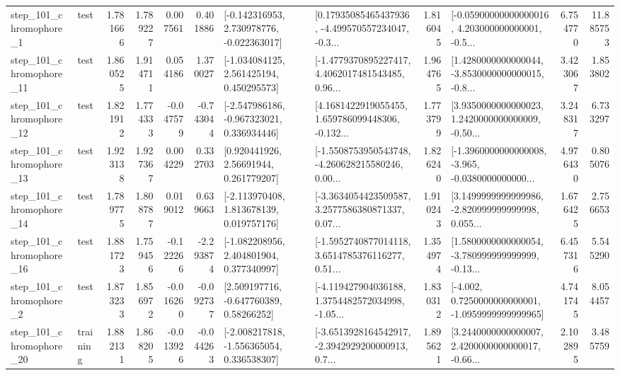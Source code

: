\begin{tabular}{llrrrrllrlrr}
   step\_101\_chromophore\_1 &      test &      1.781666 &    1.789227 &      0.007561 &  0.401886 &   [-0.142316953, 2.730978776, -0.022363017] &  [0.17935085465437936, -4.499570557234047, -0.3... &       1.816045 &  [-0.05900000000000016, 4.203000000000001, -0.5... &            6.754770 &         11.885753 \\
  step\_101\_chromophore\_11 &      test &      1.860525 &    1.914711 &      0.054186 &  1.370027 &    [-1.034084125, 2.561425194, 0.450295573] &  [-1.4779370895227417, 4.4062017481543485, 0.96... &       1.964765 &  [1.4280000000000044, -3.8530000000000015, -0.8... &            3.423067 &          1.853802 \\
  step\_101\_chromophore\_12 &      test &      1.821912 &    1.774333 &     -0.047579 & -0.743044 &   [-2.547986186, -0.967323021, 0.336934446] &  [4.1681422919055455, 1.659786099448306, -0.132... &       1.773799 &  [3.9350000000000023, 1.2420000000000009, -0.50... &            3.248317 &          6.733297 \\
  step\_101\_chromophore\_13 &      test &      1.923138 &    1.927367 &      0.004229 &  0.332703 &      [0.920441926, 2.56691944, 0.261779207] &  [-1.5508753950543748, -4.260628215580246, 0.00... &       1.826240 &  [-1.3960000000000008, -3.965, -0.0380000000000... &            4.976430 &          0.805076 \\
  step\_101\_chromophore\_14 &      test &      1.789775 &    1.808787 &      0.019012 &  0.639663 &    [-2.113970408, 1.813678139, 0.019757176] &  [-3.3634054423509587, 3.2577586380871337, 0.07... &       1.910243 &  [3.1499999999999986, -2.820999999999998, 0.055... &            1.676425 &          2.756653 \\
  step\_101\_chromophore\_16 &      test &      1.881723 &    1.759456 &     -0.122266 & -2.293874 &    [-1.082208956, 2.404801904, 0.377340997] &  [-1.5952740877014118, 3.6514785376116277, 0.51... &       1.354974 &  [1.5800000000000054, -3.780999999999999, -0.13... &            6.457316 &          5.545290 \\
   step\_101\_chromophore\_2 &      test &      1.873233 &    1.856972 &     -0.016260 & -0.092737 &     [2.509197716, -0.647760389, 0.58266252] &  [-4.119427904036188, 1.3754482572034998, -1.05... &       1.830312 &  [-4.002, 0.7250000000000001, -1.0959999999999965] &            4.741745 &          8.054457 \\
  step\_101\_chromophore\_20 &  training &      1.882131 &    1.868205 &     -0.013926 & -0.044263 &   [-2.008217818, -1.556365054, 0.336538307] &  [-3.6513928164542917, -2.3942929200000913, 0.7... &       1.895621 &  [3.2440000000000007, 2.4200000000000017, -0.66... &            2.102895 &          3.485759 \\

\end{tabular}
